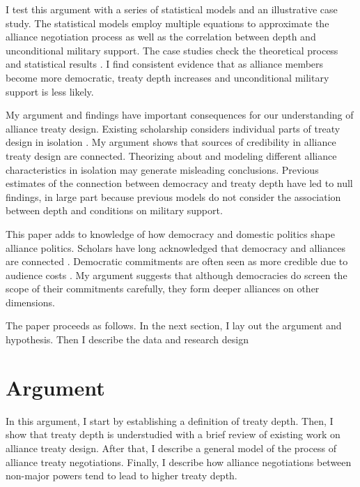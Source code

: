 \documentclass[12pt]{article}
\begin{document}
I test this argument with a series of statistical models and an illustrative case study.
The statistical models employ multiple equations to approximate the alliance negotiation process as well as the correlation between depth and unconditional military support. 
The case studies check the theoretical process and statistical results \citep{SeawrightGerring2008, Seawright2016}. 
I find consistent evidence that as alliance members become more democratic, treaty depth increases and unconditional military support is less likely. 


My argument and findings have important consequences for our understanding of alliance treaty design. 
Existing scholarship considers individual parts of treaty design in isolation \citep{Benson2012, Mattes2012, Chibaetal2015}. 
My argument shows that sources of credibility in alliance treaty design are connected. 
Theorizing about and modeling different alliance characteristics in isolation may generate misleading conclusions. 
Previous estimates of the connection between democracy and treaty depth have led to null findings, in large part because previous models do not consider the association between depth and conditions on military support. 


This paper adds to knowledge of how democracy and domestic politics shape alliance politics. 
Scholars have long acknowledged that democracy and alliances are connected \citep{LaiReiter2000, GiblerWolford2006, Warren2016, McManusYarhi-Milo2017}. 
Democratic commitments are often seen as more credible due to audience costs \citep{DigiuseppePoast2016}. 
My argument suggests that although democracies do screen the scope of their commitments carefully, they form deeper alliances on other dimensions.  



The paper proceeds as follows. 
In the next section, I lay out the argument and hypothesis. 
Then I describe the data and research design 


\section{Argument}


In this argument, I start by establishing a definition of treaty depth. 
Then, I show that treaty depth is understudied with a brief review of existing work on alliance treaty design. 
After that, I describe a general model of the process of alliance treaty negotiations. 
Finally, I describe how alliance negotiations between non-major powers tend to lead to higher treaty depth. 
\end{document}
